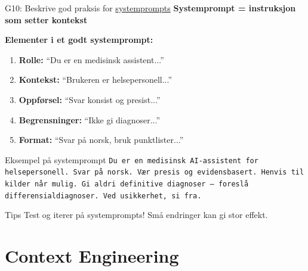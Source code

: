 \documentclass[aspectratio=169, 10pt]{beamer}
\begin{document}
\begin{frame}{G10: Beskrive god praksis for \href{https://en.wikipedia.org/wiki/Prompt_engineering\#System_prompts}{systemprompts}}
    \textbf{Systemprompt = instruksjon som setter kontekst}

    \vspace{0.2cm}
    \textbf{Elementer i et godt systemprompt:}
    \begin{enumerate}
        \item \textbf{Rolle:} ``Du er en medisinsk assistent...''
        \item \textbf{Kontekst:} ``Brukeren er helsepersonell...''
        \item \textbf{Oppførsel:} ``Svar konsist og presist...''
        \item \textbf{Begrensninger:} ``Ikke gi diagnoser...''
        \item \textbf{Format:} ``Svar på norsk, bruk punktlister...''
    \end{enumerate}

    \vspace{0.15cm}
    \begin{block}{\footnotesize Eksempel på systemprompt}
        \scriptsize
        \texttt{Du er en medisinsk AI-assistent for helsepersonell. Svar på norsk. Vær presis og evidensbasert. Henvis til kilder når mulig. Gi aldri definitive diagnoser -- foreslå differensialdiagnoser. Ved usikkerhet, si fra.}
    \end{block}

    \begin{alertblock}{\footnotesize Tips}
        \footnotesize Test og iterer på systemprompts! Små endringer kan gi stor effekt.
    \end{alertblock}
\end{frame}

\section{Context Engineering}
\end{document}
